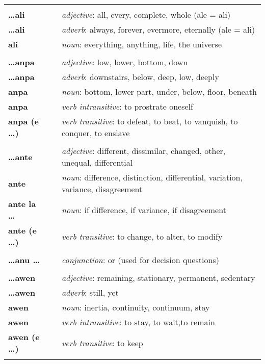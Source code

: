 \begin{supertabular}{p{2,5cm}|ll}
 && \\ %
\textbf{\dots ali} && \textit{adjective}: all, every, complete, whole (ale = ali) \\ 
\textbf{\dots ali} && \textit{adverb}: always, forever, evermore, eternally (ale = ali) \\ 
\textbf{ali} && \textit{noun}: everything, anything, life, the universe \\ 
 && \\ %
\textbf{\dots anpa} && \textit{adjective}: low, lower, bottom, down \\ 
\textbf{\dots anpa} && \textit{adverb}: downstairs, below, deep, low, deeply \\ 
\textbf{anpa} && \textit{noun}: bottom, lower part, under, below, floor, beneath \\ 
\textbf{anpa} && \textit{verb intransitive}: to prostrate oneself \\
\textbf{anpa (e \dots)} && \textit{verb transitive}: to defeat, to beat, to vanquish, to conquer, to enslave \\ 
 && \\ %
\textbf{\dots ante} && \textit{adjective}: different, dissimilar, changed, other, unequal, differential \\ 
\textbf{ante} && \textit{noun}: difference, distinction, differential, variation, variance, disagreement \\ 
\textbf{ante la \dots} && \textit{noun}: if difference, if variance, if disagreement  \\ 
\textbf{ante (e \dots)} && \textit{verb transitive}: to change, to alter, to modify \\ 
 && \\ %
\textbf{\dots anu \dots} && \textit{conjunction}: or (used for decision questions) \\ 
 && \\ %
\textbf{\dots awen} && \textit{adjective}: remaining, stationary, permanent, sedentary \\ 
\textbf{\dots awen} && \textit{adverb}: still, yet \\ 
\textbf{awen} && \textit{noun}: inertia, continuity, continuum, stay \\ 
\textbf{awen} && \textit{verb intransitive}: to stay, to wait,to remain \\ 
\textbf{awen (e \dots)} && \textit{verb transitive}: to keep \\ 
 && \\ %

\end{supertabular}
